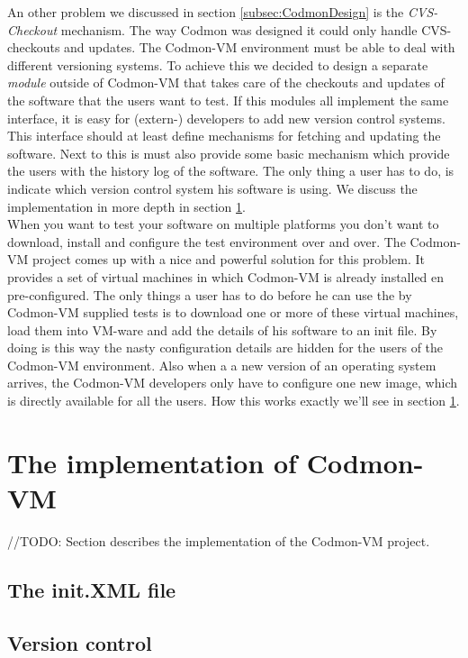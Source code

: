 \documentclass[a4paper,10pt]{scrartcl}
\newcommand{\project}{Codmon-VM}
\begin{document}
\noindent An other problem we discussed in section \ref{subsec:CodmonDesign} is the \emph{CVS-Checkout} mechanism. The way Codmon was designed it could only handle CVS-checkouts and updates. The \project{} 
environment must be able to deal with different versioning systems. To achieve this we decided to design a separate \emph{module} outside of \project{} that takes care of the checkouts and updates of the 
software that the users want to test. If this modules all implement the same interface, it is easy for (extern-) developers to add new version control systems. This interface should at least define mechanisms 
for fetching and updating the software. Next to this is must also provide some basic mechanism which provide the users with the history log of the software. The only thing a user has to do, is indicate which 
version control system his software is using. We discuss the implementation in more depth in section \ref{sec:Codmon2.0}.\\

\noindent When you want to test your software on multiple platforms you don't want to download, install and configure the test environment over and over. The \project{} project comes up with a nice and powerful 
solution for this problem. It provides a set of virtual machines in which \project{} is already installed en pre-configured. The only things a user has to do before he can use the by \project{} supplied tests is
to download one or more of these virtual machines, load them into VM-ware and add the details of his software to an init file. By doing is this way the nasty configuration details are hidden for the users of the 
\project{} environment. Also when a a new version of an operating system arrives, the \project{} developers only have to configure one new image, which is directly available for all the users. How this works 
exactly we'll see in section \ref{sec:Codmon2.0}. 

\newpage
\section{The implementation of \project{}}
\label{sec:Codmon2.0}
//TODO: Section describes the implementation of the \project{} project.
\subsection{The init.XML file}
\label{subsec:init}

\subsection{Version control}
\label{subsec:versionControl}
\end{document}
